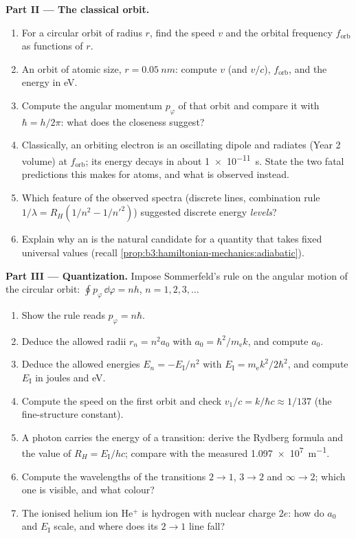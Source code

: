 \begin{problem}
\medskip\noindent\textbf{Part II --- The classical orbit.}
\begin{enumerate}[resume]
  \item For a circular orbit of radius $r$, find the speed $v$ and the
        orbital frequency $f_{\text{orb}}$ as functions of $r$.
  \item An orbit of atomic size, $r = \qty{0.05}{nm}$: compute $v$
        (and $v/c$), $f_{\text{orb}}$, and the energy in eV.
  \item Compute the angular momentum $p_\varphi$ of that orbit and
        compare it with $\hbar = h/2\pi$: what does the closeness
        suggest?
  \item Classically, an orbiting electron is an oscillating dipole and
        radiates (Year 2 volume) at $f_{\text{orb}}$; its energy
        decays in about \qty{1e-11}{s}. State the two fatal
        predictions this makes for atoms, and what is observed
        instead.
  \item Which feature of the observed spectra (discrete lines,
        combination rule $1/\lambda = R_H(1/n^2 - 1/n'^2)$) suggested
        discrete energy \emph{levels}?
  \item Explain why an \emph{} is the natural
        candidate for a quantity that takes fixed universal values
        (recall \cref{prop:b3:hamiltonian-mechanics:adiabatic}).
\end{enumerate}

\medskip\noindent\textbf{Part III --- Quantization.}
Impose Sommerfeld's rule on the angular motion of the circular orbit:
$\oint p_\varphi\,\dd\varphi = nh$, $n = 1, 2, 3, \dots$
\begin{enumerate}[resume]
  \item Show the rule reads $p_\varphi = n\hbar$.
  \item Deduce the allowed radii $r_n = n^2a_0$ with $a_0 =
        \hbar^2/m_{\text{e}}k$, and compute $a_0$.
  \item Deduce the allowed energies $E_n = -E_{\text{I}}/n^2$ with
        $E_{\text{I}} = m_{\text{e}}k^2/2\hbar^2$, and compute
        $E_{\text{I}}$ in joules and eV.
  \item Compute the speed on the first orbit and check $v_1/c =
        k/\hbar c \approx 1/137$ (the fine-structure constant).
  \item A photon carries the energy of a transition: derive the
        Rydberg formula and the value of $R_H = E_{\text{I}}/hc$;
        compare with the measured \qty{1.097e7}{m^{-1}}.
  \item Compute the wavelengths of the transitions $2 \to 1$,
        $3 \to 2$ and $\infty \to 2$; which one is visible, and what
        colour?
  \item The ionised helium ion He$^+$ is hydrogen with nuclear charge
        $2e$: how do $a_0$ and $E_{\text{I}}$ scale, and where does
        its $2 \to 1$ line fall?
\end{enumerate}


\end{problem}
